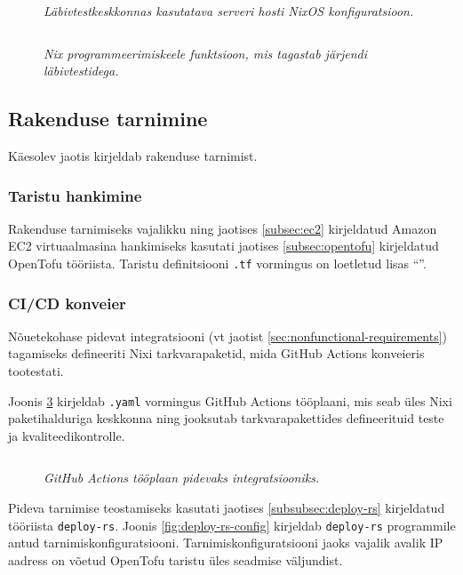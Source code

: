 \begin{figure}
\inputminted[breaklines]{nix}{chapters/data/test-vm-server.nix}
\caption{\emph{Läbivtestkeskkonnas kasutatava serveri hosti NixOS konfiguratsioon.}}\label{fig:test-vm-server}
\end{figure}

\begin{figure}
\inputminted[breaklines]{nix}{chapters/data/vm-tests.nix}
\caption{\emph{Nix programmeerimiskeele funktsioon, mis tagastab järjendi läbivtestidega.}}\label{fig:vm-tests}
\end{figure}

\subsection{Rakenduse tarnimine}\label{subsec:cicd}

Käesolev jaotis kirjeldab rakenduse tarnimist.

\subsubsection{Taristu hankimine}

Rakenduse tarnimiseks vajalikku ning jaotises \ref{subsec:ec2} kirjeldatud Amazon EC2 virtuaalmasina hankimiseks kasutati jaotises \ref{subsec:opentofu} kirjeldatud OpenTofu tööriista. Taristu definitsiooni \texttt{.tf} vormingus on loetletud lisas ``''.

\subsubsection{CI/CD konveier}

Nõuetekohase pidevat integratsiooni (vt jaotist \ref{sec:nonfunctional-requirements}) tagamiseks defineeriti Nixi tarkvarapaketid, mida GitHub Actions konveieris tootestati.

Joonis \ref{fig:ci-yaml} kirjeldab \texttt{.yaml} vormingus GitHub Actions tööplaani, mis seab üles Nixi paketihalduriga keskkonna ning jooksutab tarkvarapakettides defineerituid teste ja kvaliteedikontrolle.

\begin{figure}
\inputminted[breaklines]{yaml}{chapters/data/ci.yaml}
\caption{\emph{GitHub Actions tööplaan pidevaks integratsiooniks.}}\label{fig:ci-yaml}
\end{figure}

Pideva tarnimise teostamiseks kasutati jaotises \ref{subsubsec:deploy-rs} kirjeldatud tööriista \texttt{deploy-rs}. Joonis \ref{fig:deploy-rs-config} kirjeldab \texttt{deploy-rs} programmile antud tarnimiskonfiguratsiooni. Tarnimiskonfiguratsiooni jaoks vajalik avalik IP aadress on võetud OpenTofu taristu üles seadmise väljundist.


